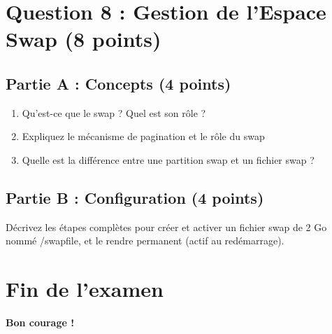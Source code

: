 \documentclass[12pt,a4paper]{article}
\begin{document}
\newpage


\section{Question 8 : Gestion de l'Espace Swap (8 points)}

\begin{questionbox}
\subsection*{Partie A : Concepts (4 points)}
\begin{enumerate}[label=\alph*)]
    \item Qu'est-ce que le swap ? Quel est son rôle ?
    \item Expliquez le mécanisme de pagination et le rôle du swap
    \item Quelle est la différence entre une partition swap et un fichier swap ?
\end{enumerate}

\subsection*{Partie B : Configuration (4 points)}
Décrivez les étapes complètes pour créer et activer un fichier swap de 2 Go nommé /swapfile, et le rendre permanent (actif au redémarrage).
\end{questionbox}

\newpage

\section*{Fin de l'examen}

\textbf{Bon courage !}
\end{document}

